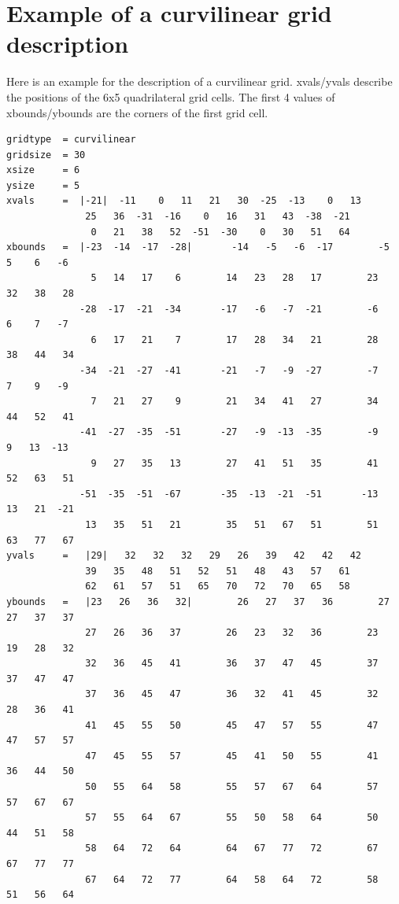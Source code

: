 \section{Example of a curvilinear grid description}
Here is an example for the {\CDO} description of a curvilinear grid.
xvals/yvals describe the positions of the 6x5 quadrilateral grid cells.
The first 4 values of xbounds/ybounds are the corners of the first grid cell.
\begin{lstlisting}[frame=single, backgroundcolor=\color{pcolor1}, basicstyle=\footnotesize]
gridtype  = curvilinear
gridsize  = 30
xsize     = 6
ysize     = 5
xvals     =  |-21|  -11    0   11   21   30  -25  -13    0   13
              25   36  -31  -16    0   16   31   43  -38  -21
               0   21   38   52  -51  -30    0   30   51   64
xbounds   =  |-23  -14  -17  -28|       -14   -5   -6  -17        -5    5    6   -6
               5   14   17    6        14   23   28   17        23   32   38   28
             -28  -17  -21  -34       -17   -6   -7  -21        -6    6    7   -7
               6   17   21    7        17   28   34   21        28   38   44   34
             -34  -21  -27  -41       -21   -7   -9  -27        -7    7    9   -9
               7   21   27    9        21   34   41   27        34   44   52   41
             -41  -27  -35  -51       -27   -9  -13  -35        -9    9   13  -13
               9   27   35   13        27   41   51   35        41   52   63   51
             -51  -35  -51  -67       -35  -13  -21  -51       -13   13   21  -21
              13   35   51   21        35   51   67   51        51   63   77   67
yvals     =   |29|   32   32   32   29   26   39   42   42   42
              39   35   48   51   52   51   48   43   57   61
              62   61   57   51   65   70   72   70   65   58
ybounds   =   |23   26   36   32|        26   27   37   36        27   27   37   37
              27   26   36   37        26   23   32   36        23   19   28   32
              32   36   45   41        36   37   47   45        37   37   47   47
              37   36   45   47        36   32   41   45        32   28   36   41
              41   45   55   50        45   47   57   55        47   47   57   57
              47   45   55   57        45   41   50   55        41   36   44   50
              50   55   64   58        55   57   67   64        57   57   67   67
              57   55   64   67        55   50   58   64        50   44   51   58
              58   64   72   64        64   67   77   72        67   67   77   77
              67   64   72   77        64   58   64   72        58   51   56   64
\end{lstlisting}

